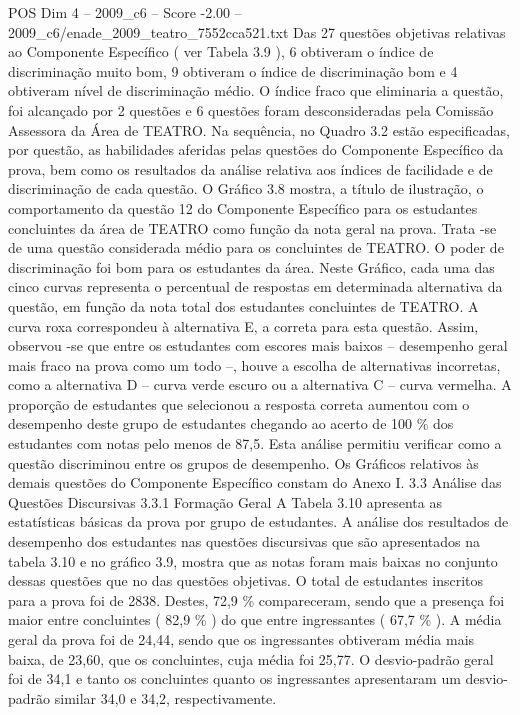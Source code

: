 \begin{textsample}{POS Dim 4 – 2009\_c6 – Score -2.00 – 2009\_c6/enade\_2009\_teatro\_7552cca521.txt}
Das 27 questões objetivas relativas ao Componente Específico ( ver Tabela 3.9 ), 6 obtiveram o índice de discriminação muito bom, 9 obtiveram o índice de discriminação bom e 4 obtiveram nível de discriminação médio.
O índice fraco que eliminaria a questão, foi alcançado por 2 questões e 6 questões foram desconsideradas pela Comissão Assessora da Área de TEATRO.
Na sequência, no Quadro 3.2 estão especificadas, por questão, as habilidades aferidas pelas questões do Componente Específico da prova, bem como os resultados da análise relativa aos índices de facilidade e de discriminação de cada questão.
O Gráfico 3.8 mostra, a título de ilustração, o comportamento da questão 12 do Componente Específico para os estudantes concluintes da área de TEATRO como função da nota geral na prova.
Trata -se de uma questão considerada médio para os concluintes de TEATRO.
O poder de discriminação foi bom para os estudantes da área.
Neste Gráfico, cada uma das cinco curvas representa o percentual de respostas em determinada alternativa da questão, em função da nota total dos estudantes concluintes de TEATRO.
A curva roxa correspondeu à alternativa E, a correta para esta questão.
Assim, observou -se que entre os estudantes com escores mais baixos – desempenho geral mais fraco na prova como um todo –, houve a escolha de alternativas incorretas, como a alternativa D – curva verde escuro ou a alternativa C – curva vermelha.
A proporção de estudantes que selecionou a resposta correta aumentou com o desempenho deste grupo de estudantes chegando ao acerto de 100 \% dos estudantes com notas pelo menos de 87,5.
Esta análise permitiu verificar como a questão discriminou entre os grupos de desempenho.
Os Gráficos relativos às demais questões do Componente Específico constam do Anexo I. 3.3 Análise das Questões Discursivas 3.3.1 Formação Geral A Tabela 3.10 apresenta as estatísticas básicas da prova por grupo de estudantes.
A análise dos resultados de desempenho dos estudantes nas questões discursivas que são apresentados na tabela 3.10 e no gráfico 3.9, mostra que as notas foram mais baixas no conjunto dessas questões que no das questões objetivas.
O total de estudantes inscritos para a prova foi de 2838.
Destes, 72,9 \% compareceram, sendo que a presença foi maior entre concluintes ( 82,9 \% ) do que entre ingressantes ( 67,7 \% ).
A média geral da prova foi de 24,44, sendo que os ingressantes obtiveram média mais baixa, de 23,60, que os concluintes, cuja média foi 25,77.
O desvio-padrão geral foi de 34,1 e tanto os concluintes quanto os ingressantes apresentaram um desvio-padrão similar 34,0 e 34,2, respectivamente.

\end{textsample}
